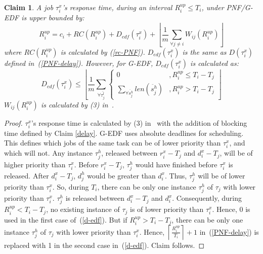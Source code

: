 \documentclass[twocolumn]{article}
\newtheorem{clm}{Claim}
\newtheorem{proof}{Proof}
\begin{document}
\begin{clm}\label{response time ecm PNF}
A job $\tau_{i}^{x}$'s response time, during an interval $R_i^{up}\le T_{i}$, under PNF/G-EDF is upper bounded by:
\begin{equation}
R_{i}^{up}=c_{i}+RC(R_i^{up})+D_{edf}(\tau_{i}^{x})+\left\lfloor \frac{1}{m}\sum_{\forall j\ne i}W_{ij}(R_{i}^{up})\right\rfloor 
\end{equation}
where $RC(R_i^{up})$ is calculated by (\ref{rc-PNF}). $D_{edf}(\tau_{i}^{x})$
is the same as $D(\tau_{i}^{x})$ defined in~(\ref{PNF-delay}). However, for G-EDF, $D_{edf}(\tau_i^x)$ is calculated as:
\begin{equation}
D_{edf}(\tau_{i}^{x})\le\left\lfloor \frac{1}{m}\sum_{\forall\bar{\tau_{j}^{l}}}\begin{cases}
0 & ,R_i^{up}\le T_{i}-T_{j}\\
\sum_{\forall\ddot{s_{j}^{h}}}len\left(\ddot{s_{j}^{h}}\right) & ,R_i^{up}>T_{i}-T_{j}
\end{cases}\right\rfloor \label{d-edf}
\end{equation}
$W_{ij}(R_{i}^{up})$ is calculated by (3) in~\cite{stmconcurrencycontrol:emsoft11}.
\end{clm}
\begin{proof}\normalfont
$\tau_{i}^{x}$'s response time is calculated by (3) in~\cite{stmconcurrencycontrol:emsoft11} with the addition of blocking time defined by Claim \ref{delay}. G-EDF uses absolute deadlines for scheduling. This defines which jobs of the same task can be of lower priority than $\tau_{i}^{x}$, and which will not. Any instance $\tau_j^h$, released between $r_i^x - T_j$ and $d_i^x - T_j$, will be of higher priority than $\tau_i^x$. Before $r_i^x-T_j$, $\tau_j^h$ would have finished before $\tau_i^x$ is released. After $d_i^x-T_j$, $d_j^h$ would be greater than $d_i^x$. Thus, $\tau_j^h$ will be of lower priority than $\tau_i^x$. So, during $T_i$, there can be only one instance $\tau_j^h$ of $\tau_j$ with lower priority than $\tau_i^x$. $\tau_j^h$ is released between $d_i^x-T_j$ and $d_i^x$. Consequently, during $R_i^{up}<T_i-T_j$, no existing instance of $\tau_j$ is of lower  priority than $\tau_i^x$. Hence, 0 is used in the first case of~(\ref{d-edf}). But if $R_i^{up}>T_i-T_j$, there can be only one instance $\tau_j^h$ of $\tau_j$ with lower priority than $\tau_i^x$. Hence, $\left\lceil\frac{R_i^{up}}{T_i}\right\rceil+1$ in~(\ref{PNF-delay}) is replaced with 1 in the second case in~(\ref{d-edf}). Claim follows.
\end{proof}
\end{document}
